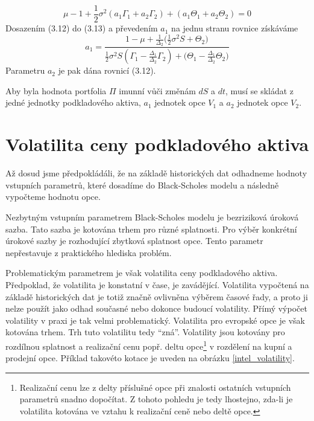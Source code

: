 \documentclass[a4paper]{book}
\begin{document}
\begin{equation}
\mu - 1 + \frac{1}{2}\sigma^2(a_1 \Gamma_1 + a_2 \Gamma_2) + (a_1 \Theta_1 + a_2 \Theta_2) = 0
\end{equation}
Dosazením (3.12) do (3.13) a převedením $a_1$ na jednu stranu rovnice získáváme
\begin{equation*}
a_1 = \frac{1 - \mu + \frac{1}{\Delta_2}\bigg( \frac{1}{2} \sigma^2 S + \Theta_2 \bigg)}{\frac{1}{2} \sigma^2 S (\Gamma_1 - \frac{\Delta_1}{\Delta_2}\Gamma_2) + \bigg( \Theta_1 - \frac{\Delta_1}{\Delta_2} \Theta_2 \bigg)}
\end{equation*}
Parametru $a_2$ je pak dána rovnicí (3.12).

Aby byla hodnota portfolia $\Pi$ imunní vůči změnám $dS$ a $dt$, musí se skládat z jedné jednotky podkladového aktiva, $a_1$ jednotek opce $V_1$ a $a_2$ jednotek opce $V_2$.

\section{Volatilita ceny podkladového aktiva}

Až dosud jsme předpokládáli, že na základě historických dat odhadneme hodnoty vstupních parametrů, které dosadíme do Black-Scholes modelu a následně vypočteme hodnotu opce.

Nezbytným vstupním parametrem Black-Scholes modelu je bezriziková úroková sazba. Tato sazba je kotována trhem pro různé splatnosti. Pro výběr konkrétní úrokové sazby je rozhodující zbytková splatnost opce. Tento parametr nepřestavuje z praktického hlediska problém.

Problematickým parametrem je však volatilita ceny podkladového aktiva. Předpoklad, že volatilita je konstatní v čase, je zavádějící. Volatilita vypočtená na základě historických dat je totiž značně ovlivněna výběrem časové řady, a proto ji nelze použít jako odhad současné nebo dokonce budoucí volatility. Přímý výpočet volatility v praxi je tak velmi problematický. Volatilita pro evropské opce je však kotována trhem. Trh tuto volatilitu tedy ``zná''. Volatility jsou kotovány pro rozdílnou splatnost a realizační cenu popř. deltu opce\footnote{Realizační cenu lze z delty příslušné opce při znalosti ostatních vstupních parametrů snadno dopočítat. Z tohoto pohledu je tedy lhostejno, zda-li je volatilita kotována ve vztahu k realizační ceně nebo deltě opce.} v rozdělení na kupní a prodejní opce. Příklad takovéto kotace je uveden na obrázku \ref{intel_volatility}.
\end{document}
